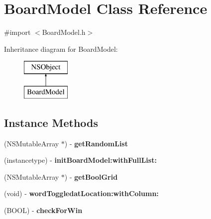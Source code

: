 \hypertarget{interface_board_model}{\section{Board\+Model Class Reference}
\label{interface_board_model}
}


{\ttfamily \#import $<$Board\+Model.\+h$>$}

Inheritance diagram for Board\+Model\+:\begin{figure}[H]
\begin{center}
\leavevmode
\includegraphics[height=2.000000cm]{interface_board_model}
\end{center}
\end{figure}
\subsection*{Instance Methods}
\begin{DoxyCompactItemize}
\item 
\hypertarget{interface_board_model_a70fe1a2a44e5a9dbace6b2fb857d9f12}{(N\+S\+Mutable\+Array $\ast$) -\/ {\bfseries get\+Random\+List}}\label{interface_board_model_a70fe1a2a44e5a9dbace6b2fb857d9f12}

\item 
\hypertarget{interface_board_model_ab555aaae81c713fbcf9dca0e46bd6321}{(instancetype) -\/ {\bfseries init\+Board\+Model\+:with\+Full\+List\+:}}\label{interface_board_model_ab555aaae81c713fbcf9dca0e46bd6321}

\item 
\hypertarget{interface_board_model_a558c765532e813460841221775e3be90}{(N\+S\+Mutable\+Array $\ast$) -\/ {\bfseries get\+Bool\+Grid}}\label{interface_board_model_a558c765532e813460841221775e3be90}

\item 
\hypertarget{interface_board_model_a86a3cd7ea069062a0a0c577596c5c762}{(void) -\/ {\bfseries word\+Toggledat\+Location\+:with\+Column\+:}}\label{interface_board_model_a86a3cd7ea069062a0a0c577596c5c762}

\item 
\hypertarget{interface_board_model_a7898a7f1b1e6d0b6d39d76f2b8ea3c00}{(B\+O\+O\+L) -\/ {\bfseries check\+For\+Win}}\label{interface_board_model_a7898a7f1b1e6d0b6d39d76f2b8ea3c00}

\end{DoxyCompactItemize}
